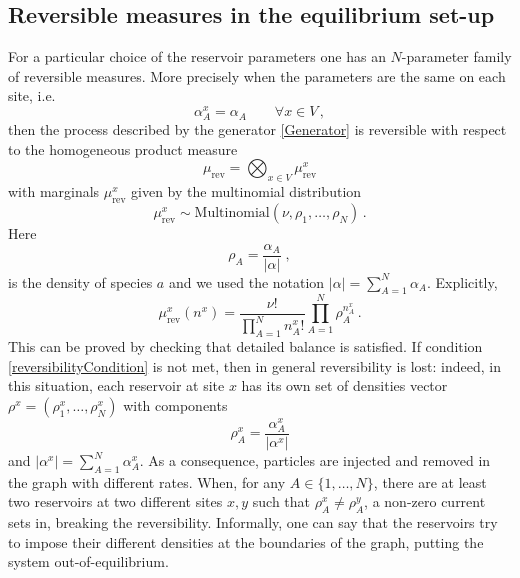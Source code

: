 \documentclass[10pt]{article}
\numberwithin{equation}{section}
\numberwithin{equation}{subsection}
\newcommand{\co}{\;,}
\newcommand{\twoj}{\nu}
\newcommand{\fra}[1]{\textcolor[rgb]{0,0,1}{#1}}
\begin{document}
\subsection{Reversible measures in the equilibrium set-up}
For a particular choice of the reservoir parameters one has an $N$-parameter family of reversible measures. More precisely
when the parameters are the same on each site, i.e.
\begin{equation}\label{reversibilityCondition}
\alpha_{A}^{x}=\alpha_{A}\qquad \forall x\in V\,,
\end{equation}
then the process described by the generator \eqref{Generator} is reversible with respect to the 
homogeneous product measure 
\begin{equation}
\label{reversibleMeasure}
\mu_{\text{rev}}=\bigotimes_{x\in V}\mu_{\text{rev}}^{x}
\end{equation}
with marginals $\mu_{\text{rev}}^{x}$ given by  the multinomial distribution
\begin{equation}
 \mu^{x}_{\text{rev}}\sim \text{Multinomial}\left(\twoj,\rho_{1},\ldots,\rho_{N}\right)\,.
\end{equation}
Here
 $$
\rho_{A}=\frac{\alpha_{A}}{|\alpha|}\co
$$
is the density of species $a$ and we used the notation $|\alpha|=\sum_{A=1}^{N}\alpha_{A}$. Explicitly, 
\begin{equation}
\mu_{\text{rev}}^{x}(n^{x})=\frac{\nu!}{\prod_{A=1}^{N}n_{A}^{x}!}\prod_{A=1}^{N}\rho_{A}^{n_{A}^{x}}\,.
\end{equation}
This can be proved  by checking that detailed balance is satisfied. 
If condition \eqref{reversibilityCondition} is not met, then in general reversibility is lost: indeed, in this situation, each reservoir at site $x$ has  its own set of densities vector $\rho^{x}=(\rho_{1}^{x},\ldots,\rho_{N}^{x})$ with components
\begin{equation}
	\label{rhox}
	\rho_{A}^x=\frac{\alpha_{A}^x}{|\alpha^x|}
\end{equation}
and  $|\alpha^x|=\sum_{A=1}^{N}\alpha_{A}^x$. {As a consequence, particles are injected and removed in the graph with different rates. When, for any $A\in \{1,\ldots,N\}$, there are at least two reservoirs at two different sites $x,y$ such that $\rho_{A}^{x}\neq  \rho_{A}^{y}$, a  non-zero current sets in, breaking the reversibility. Informally, one can say that the reservoirs try to impose their different densities at the boundaries of \fra{the} graph, putting the system out-of-equilibrium.} 
\end{document}
